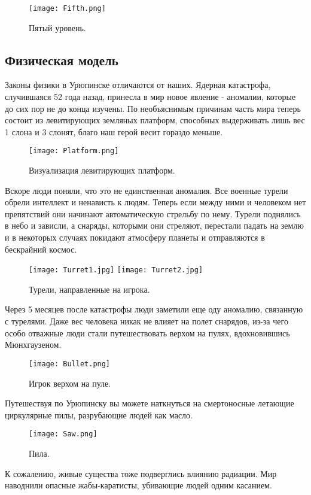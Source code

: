 \documentclass[a4paper,12pt]{article}
\begin{document}
\begin{figure}[H] 
    \centering
    \texttt{[image: Fifth.png]} 
    \caption{Пятый уровень.}
    \label{fig:player_character}
\end{figure}

\subsection{Физическая модель}
Законы физики в Урюпинске отличаются от наших.  Ядерная катастрофа, случившаяся 52 года назад, принесла в мир новое явление - аномалии, которые до сих пор не до конца изучены. 
По необъяснимым причинам часть мира теперь состоит из левитирующих земляных платформ, способных выдерживать лишь вес 1 слона и 3 слонят, благо наш герой весит гораздо меньше.
\begin{figure}[H] %
    \centering
    \texttt{[image: Platform.png]} %
    \caption{Визуализация левитирующих платформ.}
    \label{fig:player_character}
\end{figure}
Вскоре люди поняли, что это не единственная аномалия. Все военные турели обрели интеллект и ненависть к людям. Теперь если между ними и человеком нет препятствий они начинают автоматическую стрельбу по нему. Турели поднялись в небо и зависли, а снаряды, которыми они стреляют, перестали падать на землю и в некоторых случаях покидают атмосферу планеты и отправляются в бескрайний космос.
\begin{figure}[H] %
    \centering
    \texttt{[image: Turret1.jpg]} %
    \texttt{[image: Turret2.jpg]} %
    \caption{Турели, направленные на игрока.}
    \label{fig:player_character}
\end{figure}
Через 5 месяцев после катастрофы люди заметили еще оду аномалию, связанную с турелями. Даже вес человека никак не влияет на полет снарядов, из-за чего особо отважные люди стали путешествовать верхом на пулях, вдохновившись Мюнхгаузеном.
\begin{figure}[H] %
    \centering
    \texttt{[image: Bullet.png]} %
    \caption{Игрок верхом на пуле.}
    \label{fig:player_character}
\end{figure}
Путешествуя по Урюпинску вы можете наткнуться на смертоносные летающие циркулярные пилы, разрубающие людей как масло.
\begin{figure}[H] %
    \centering
    \texttt{[image: Saw.png]} %
    \caption{Пила.}
    \label{fig:player_character}
\end{figure}
К сожалению, живые существа тоже подверглись влиянию радиации. Мир наводнили опасные жабы-каратисты, убивающие людей одним касанием.
\end{document}
